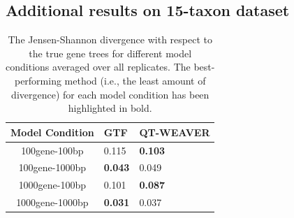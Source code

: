 \documentclass[10pt,a4paper]{article}
\begin{document}
\newpage

\subsection{Additional results on 15-taxon dataset}
\label{app:15-taxon}



\begin{table}[h!]
    \centering
    \caption{The Jensen-Shannon divergence with respect to the true gene trees for different model conditions averaged over all replicates. The best-performing method (i.e., the least amount of divergence) for each model condition has been highlighted in bold.}
    \label{tab:15-divergence}

    \begin{tabular}{|c|C{3cm}|C{3cm}|}
        \hline
        \textbf{Model Condition} & \textbf{GTF} & \textbf{QT-WEAVER} \\
        \hline
        100gene-100bp & 0.115 & \textbf{0.103} \\
        \hline
        100gene-1000bp & \textbf{0.043} & 0.049 \\
        \hline
        1000gene-100bp & 0.101 & \textbf{0.087} \\
        \hline
        1000gene-1000bp & \textbf{0.031} & 0.037 \\
        \hline
    \end{tabular}
\end{table}
\end{document}
